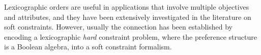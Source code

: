 \documentclass[a4paper]{elsarticle}
\newcommand{\1}{\mathbf{1}}
\begin{document}
%
%
%
Lexicographic orders are useful in applications that involve multiple objectives and attributes,
and they have been extensively investigated in the literature on soft constraints.
However, usually the connection has been established by encoding a lexicographic \emph{hard} constraint problem, where the preference structure is a Boolean algebra, 
into a soft constraint formalism. 
%
%
\end{document}
